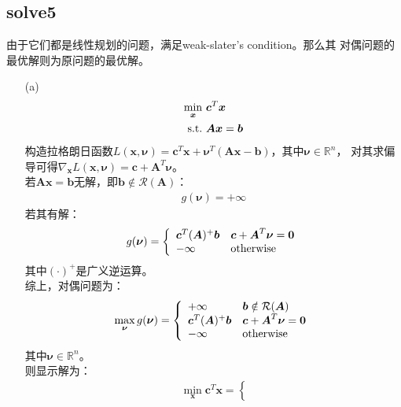 \documentclass[12pt,a4paper]{ctexart}
\begin{document}
\subsection*{solve5}
由于它们都是线性规划的问题，满足weak-slater's condition。那么其
对偶问题的最优解则为原问题的最优解。
\begin{itemize}
\item[(a)] 
\begin{align*}
    \min\limits_{\boldsymbol{x}} \ &\boldsymbol{c}^T\boldsymbol{x} \\
    \rm{s.t.}\  &\boldsymbol{Ax}=\boldsymbol{b}
\end{align*}
构造拉格朗日函数$L(\boldsymbol{x},\boldsymbol{\nu})=
\boldsymbol{c}^T\boldsymbol{x}+\boldsymbol{\nu}^T(\boldsymbol{Ax}-\boldsymbol{b})$，其中$\boldsymbol{\nu} \in \mathbb{R}^n$，
对其求偏导可得$\nabla_{\boldsymbol{x}} L(\boldsymbol{x},\boldsymbol{\nu})=\boldsymbol{c}+\boldsymbol{ A}^T \boldsymbol{\nu}$。\\
若$\boldsymbol{Ax}=\boldsymbol{b}$无解，即$\boldsymbol{b} \notin \mathcal{R}(\boldsymbol{A})$：
\begin{align*}
g(\boldsymbol{\nu})=+\infty
\end{align*}
若其有解：
\begin{align*}
g(\boldsymbol{\nu})=\left \{
\begin{array}{ll}
\boldsymbol{c}^T (\boldsymbol{A})^{+}\boldsymbol{b} &\boldsymbol{c}+\boldsymbol{A}^T \boldsymbol{\nu}=\boldsymbol{0}\\
-\infty &\rm{otherwise}
\end{array}
\right.
\end{align*}
其中$(\cdot)^+$是广义逆运算。\\
综上，对偶问题为：
\begin{align*}
    \max\limits_{\boldsymbol{\nu}} g(\boldsymbol{\nu})=\left \{
    \begin{array}{ll}
    +\infty &\boldsymbol{b} \notin \mathcal{R}(\boldsymbol{A})\\
    \boldsymbol{c}^T (\boldsymbol{A})^{+}\boldsymbol{b} &\boldsymbol{c}+\boldsymbol{A}^T \boldsymbol{\nu}=\boldsymbol{0}\\
    -\infty &\rm{otherwise}
    \end{array}
    \right.
    \end{align*}
其中$\boldsymbol{\nu}\in \mathbb{R}^n$。\\
则显示解为：
\begin{align*}
    \min\limits_{\boldsymbol{x}} \boldsymbol{c}^T\boldsymbol{x}
    =\left \{

\end{align*}
\end{itemize}
\end{document}
